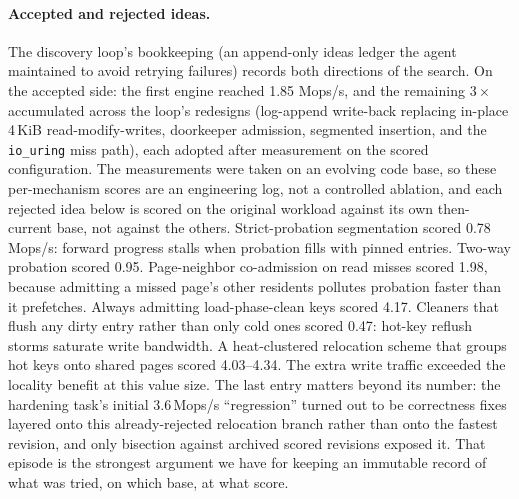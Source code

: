 \documentclass{article}
\newcommand{\HydraFirst}{1.85}          %
\begin{document}
\paragraph{Accepted and rejected ideas.}
\label{sec:negative}
The discovery loop's bookkeeping (an append-only ideas ledger the agent maintained to avoid retrying failures) records both directions of the search. On the accepted side: the first engine reached \HydraFirst{} Mops/s, and the remaining $3\times$ accumulated across the loop's redesigns (log-append write-back replacing in-place 4\,KiB read-modify-writes, doorkeeper admission, segmented insertion, and the \texttt{io\_uring} miss path), each adopted after measurement on the scored configuration. The measurements were taken on an evolving code base, so these per-mechanism scores are an engineering log, not a controlled ablation, and each rejected idea below is scored on the original workload against its own then-current base, not against the others. Strict-probation segmentation scored 0.78\,Mops/s: forward progress stalls when probation fills with pinned entries. Two-way probation scored 0.95. Page-neighbor co-admission on read misses scored 1.98, because admitting a missed page's other residents pollutes probation faster than it prefetches. Always admitting load-phase-clean keys scored 4.17. Cleaners that flush any dirty entry rather than only cold ones scored 0.47: hot-key reflush storms saturate write bandwidth. A heat-clustered relocation scheme that groups hot keys onto shared pages scored 4.03--4.34. The extra write traffic exceeded the locality benefit at this value size. The last entry matters beyond its number: the hardening task's initial 3.6\,Mops/s ``regression'' turned out to be correctness fixes layered onto this already-rejected relocation branch rather than onto the fastest revision, and only bisection against archived scored revisions exposed it. That episode is the strongest argument we have for keeping an immutable record of what was tried, on which base, at what score.
\end{document}
